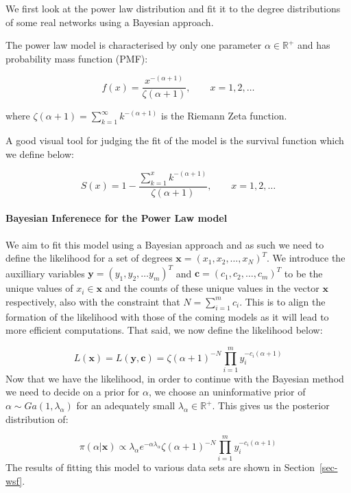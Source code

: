 \documentclass[
]{article}
\let\oldparagraph\paragraph
\renewcommand{\paragraph}[1]{\oldparagraph{#1}\mbox{}}
\begin{document}
We first look at the power law distribution and fit it to the degree
distributions of some real networks using a Bayesian approach.

The power law model is characterised by only one parameter
\(\alpha\in\mathbb{R}^+\) and has probability mass function (PMF):

\[
f(x) = \frac{x^{-(\alpha+1)}}{\zeta(\alpha+1)}, \qquad x=1,2,\ldots
\]

where \(\zeta(\alpha+1) = \sum_{k=1}^\infty k^{-(\alpha+1)}\) is the
Riemann Zeta function.

A good visual tool for judging the fit of the model is the survival
function which we define below:

\[
S(x) = 1 - \frac{\sum_{k=1}^x k^{-(\alpha+1)}}{\zeta(\alpha+1)}, \qquad x=1,2,\ldots
\]

\paragraph{Bayesian Inferenece for the Power Law
model}\label{bayesian-inferenece-for-the-power-law-model}

We aim to fit this model using a Bayesian approach and as such we need
to define the likelihood for a set of degrees
\(\boldsymbol{x} = (x_1, x_2, \ldots, x_N)^T\). We introduce the
auxilliary variables \(\boldsymbol{y} = (y_1, y_2, \ldots y_m)^T\) and
\(\boldsymbol{c} = (c_1, c_2, \ldots,c_m)^T\) to be the unique values of
\(x_i \in \boldsymbol{x}\) and the counts of these unique values in the
vector \(\boldsymbol{x}\) respectively, also with the constraint that
\(N = \sum_{i=1}^m c_i\). This is to align the formation of the
likelihood with those of the coming models as it will lead to more
efficient computations. That said, we now define the likelihood below:

\[
L(\boldsymbol{x}) = L(\boldsymbol{y},\boldsymbol{c}) =  \zeta(\alpha+1)^{-N}\prod_{i=1}^m y_i^{-c_i(\alpha+1)}
\] Now that we have the likelihood, in order to continue with the
Bayesian method we need to decide on a prior for \(\alpha\), we choose
an uninformative prior of \(\alpha\sim Ga(1,\lambda_\alpha)\) for an
adequately small \(\lambda_\alpha\in\mathbb{R^+}\). This gives us the
posterior distribution of:

\[
\pi(\alpha|\boldsymbol{x}) \propto \lambda_\alpha e^{-\alpha\lambda_\alpha}\zeta(\alpha+1)^{-N}\prod_{i=1}^m y_i^{-c_i(\alpha+1)}
\] The results of fitting this model to various data sets are shown in
Section~\ref{sec-wsf}.
\end{document}
